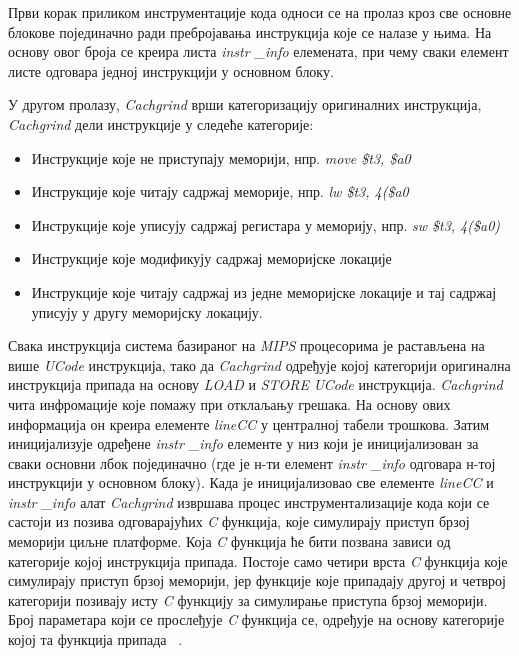 \documentclass[12pt,oneside]{memoir}
\begin{document}
\indent Први корак приликом инструментације кода односи се на пролаз кроз све основне блокове појединачно ради пребројавања инструкција које се налазе у њима. На основу овог броја се креира листа \textit{instr \_info} елемената, при чему сваки елемент листе одговара једној инструкцији у основном блоку.

\indent У другом пролазу, \textit{Cachgrind} врши категоризацију оригиналних инструкција, \textit{Cachgrind} дели инструкције у следеће категорије:

\begin{itemize}
  \item Инструкције које не приступају меморији, нпр. \textit{move \$t3, \$a0}
  \item Инструкције које читају садржај меморије, нпр. \textit{lw \$t3, 4(\$a0}
  \item Инструкције које уписују садржај регистара у меморију, нпр. \textit{sw \$t3, 4(\$a0)}
  \item Инструкције које модификују садржај меморијске локације
  \item Инструкције које читају садржај из једне меморијске локације и тај садржај уписују у другу меморијску локацију.
\end{itemize}

\indent Свака инструкција система базираног на \textit{MIPS} процесорима је растављена на више \textit{UCode} инструкција, тако да \textit{Cachgrind} одређује којој категорији оригинална инструкција припада на основу \textit{LOAD} и \textit{STORE} \textit{UCode} инструкција. \textit{Cachgrind} чита инфромације које помажу при отклаљању грешака. На основу ових информација он креира елементе \textit{lineCC} у централној табели трошкова. Затим иницијализује одређене \textit{instr \_info} елементе у  низ који је иницијализован за сваки основни лбок појединачно (где је н-ти елемент \textit{instr \_info} одговара н-тој инструкцији у основном блоку). Када је иницијализовао све елементе \textit{lineCC} и \textit{instr \_info} алат \textit{Cachgrind} извршава процес инструментализације кода који се састоји из позива одговарајућих \textit{C} функција, које симулирају приступ брзој меморији циљне платформе. Која \textit{C} функција ће бити позвана зависи од категорије којој инструкција припада. Постоје само четири врста \textit{C} функција које симулирају приступ брзој меморији, јер функције које припадају другој и четврој категорији позивају исту \textit{C} функцију за симулирање приступа брзој меморији. Број параметара који се прослеђује \textit{C} функција се, одређује на основу категорије којој та функција припада ~\cite{cachegrindRef}.
\end{document}
